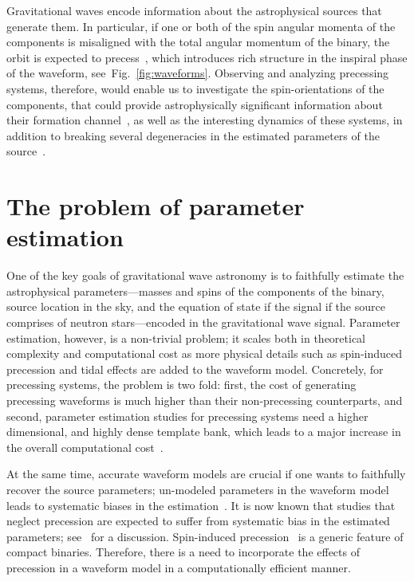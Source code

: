 Gravitational waves encode information about the astrophysical sources that
generate them. In particular, if one or both of the spin angular momenta of
the components is misaligned with the total angular momentum of the binary,
the orbit is expected to precess~\cite{Apostolatos1994}, which introduces rich
structure in the inspiral phase of the waveform, see~Fig.~\ref{fig:waveforms}.
Observing and analyzing precessing systems, therefore, would enable us to
investigate the spin-orientations of the components, that could provide
astrophysically significant information about their formation
channel~\cite{AstrophysicalImplications,Rodriguez}, as well as the interesting
dynamics of these systems, in addition to breaking several degeneracies in the
estimated parameters of the source~\cite{Shag}.

\section{The problem of parameter estimation}

One of the key goals of gravitational wave astronomy is to faithfully estimate
the astrophysical parameters---masses and spins of the components of the
binary, source location in the sky, and the equation of state if the signal if
the source comprises of neutron stars---encoded in the gravitational wave
signal. Parameter estimation, however, is a non-trivial  problem; it scales
both in theoretical complexity and computational cost as more physical details
such as spin-induced precession and tidal effects are added to the waveform
model. Concretely, for precessing systems, the problem is two fold: first, the
cost of generating precessing waveforms is much higher than their non-precessing 
counterparts, and second, parameter estimation studies for
precessing systems need a higher dimensional, and highly dense template bank,
which leads to a major increase in the overall computational
cost~\cite{Nat2017}.

At the same time, accurate waveform models are crucial if one wants to
faithfully recover the source parameters; un-modeled parameters in the
waveform model leads to systematic biases in the estimation~\cite{Bias_1,
Bias_2}.  It is now known that studies that neglect precession are expected to
suffer from systematic bias in the estimated parameters; see~\cite{Bias_1,
Bias_3}  for a discussion. Spin-induced precession~\cite{Apostolatos1994} is a
generic feature of compact binaries.  Therefore, there is a need to
incorporate the effects of precession in a waveform model in a computationally
efficient manner.

